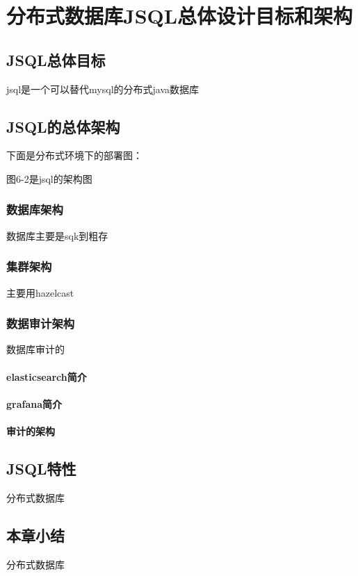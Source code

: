 
\chapter{分布式数据库JSQL总体设计目标和架构}
\section{JSQL总体目标}
jsql是一个可以替代mysql的分布式java数据库
\section{JSQL的总体架构}
下面是分布式环境下的部署图：

图6-2是jsql的架构图


\subsection{数据库架构}
数据库主要是sqk到粗存
\subsection{集群架构}
主要用hazelcast
\subsection{数据审计架构}
数据库审计的
\subsubsection{elasticsearch简介}
\subsubsection{grafana简介}
\subsubsection{审计的架构}

\section{JSQL特性}
分布式数据库

\section{本章小结}
分布式数据库

